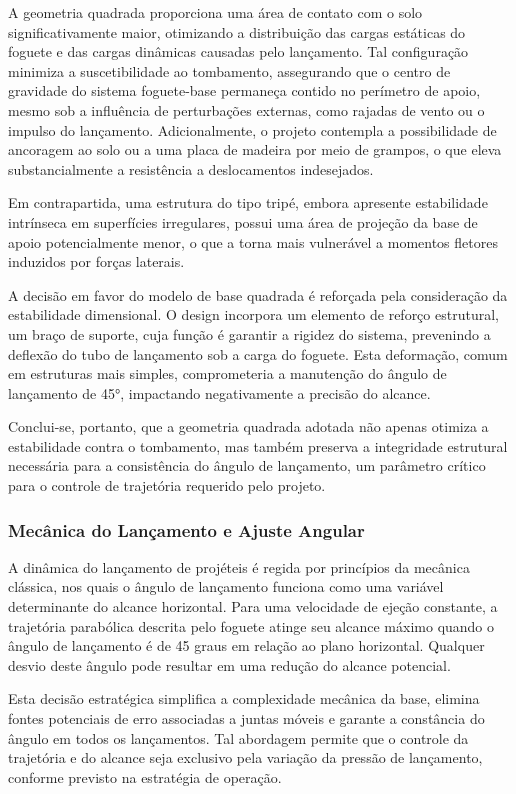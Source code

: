 A geometria quadrada proporciona uma área de contato com o solo significativamente maior, otimizando a distribuição das cargas estáticas do foguete e das cargas dinâmicas causadas pelo lançamento. Tal configuração minimiza a suscetibilidade ao tombamento, assegurando que o centro de gravidade do sistema foguete-base permaneça contido no perímetro de apoio, mesmo sob a influência de perturbações externas, como rajadas de vento ou o impulso do lançamento. Adicionalmente, o projeto contempla a possibilidade de ancoragem ao solo ou a uma placa de madeira por meio de grampos, o que eleva substancialmente a resistência a deslocamentos indesejados. 

Em contrapartida, uma estrutura do tipo tripé, embora apresente estabilidade intrínseca em superfícies irregulares, possui uma área de projeção da base de apoio potencialmente menor, o que a torna mais vulnerável a momentos fletores induzidos por forças laterais. 

A decisão em favor do modelo de base quadrada é reforçada pela consideração da estabilidade dimensional. O design incorpora um elemento de reforço estrutural, um braço de suporte, cuja função é garantir a rigidez do sistema, prevenindo a deflexão do tubo de lançamento sob a carga do foguete. Esta deformação, comum em estruturas mais simples, comprometeria a manutenção do ângulo de lançamento de 45°, impactando negativamente a precisão do alcance. 

Conclui-se, portanto, que a geometria quadrada adotada não apenas otimiza a estabilidade contra o tombamento, mas também preserva a integridade estrutural necessária para a consistência do ângulo de lançamento, um parâmetro crítico para o controle de trajetória requerido pelo projeto. 

\subsubsection{Mecânica do Lançamento e Ajuste Angular}
A dinâmica do lançamento de projéteis é regida por princípios da mecânica clássica, nos quais o ângulo de lançamento funciona como uma variável determinante do alcance horizontal. Para uma velocidade de ejeção constante, a trajetória parabólica descrita pelo foguete atinge seu alcance máximo quando o ângulo de lançamento é de 45 graus em relação ao plano horizontal. Qualquer desvio deste ângulo pode resultar em uma redução do alcance potencial. 

Esta decisão estratégica simplifica a complexidade mecânica da base, elimina fontes potenciais de erro associadas a juntas móveis e garante a constância do ângulo em todos os lançamentos. Tal abordagem permite que o controle da trajetória e do alcance seja exclusivo pela variação da pressão de lançamento, conforme previsto na estratégia de operação. 

